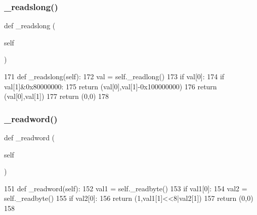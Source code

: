 \subsubsection{\texorpdfstring{\+\_\+readslong()}{\_readslong()}}
{\footnotesize\ttfamily def \+\_\+readslong (\begin{DoxyParamCaption}\item[{}]{self }\end{DoxyParamCaption})\hspace{0.3cm}{\ttfamily [private]}}


\begin{DoxyCode}
171     \textcolor{keyword}{def }\_readslong(self):
172         val = self.\_readlong()
173         \textcolor{keywordflow}{if} val[0]:
174             \textcolor{keywordflow}{if} val[1]&0x80000000:
175                 \textcolor{keywordflow}{return} (val[0],val[1]-0x100000000)
176             \textcolor{keywordflow}{return} (val[0],val[1])
177         \textcolor{keywordflow}{return} (0,0)
178 
\end{DoxyCode}
\mbox{\label{classtoxic__hardware_1_1roboclaw__3_1_1Roboclaw_ab108cec36d976e3c49fbcba8b1406ff3}} 
\subsubsection{\texorpdfstring{\+\_\+readword()}{\_readword()}}
{\footnotesize\ttfamily def \+\_\+readword (\begin{DoxyParamCaption}\item[{}]{self }\end{DoxyParamCaption})\hspace{0.3cm}{\ttfamily [private]}}


\begin{DoxyCode}
151     \textcolor{keyword}{def }\_readword(self):
152         val1 = self.\_readbyte()
153         \textcolor{keywordflow}{if} val1[0]:
154             val2 = self.\_readbyte()
155             \textcolor{keywordflow}{if} val2[0]:
156                 \textcolor{keywordflow}{return} (1,val1[1]<<8|val2[1])
157         \textcolor{keywordflow}{return} (0,0)
158 
\end{DoxyCode}
\mbox{\label{classtoxic__hardware_1_1roboclaw__3_1_1Roboclaw_a90f7346f5ad7ac6e783798a1f755d6e9}} 

